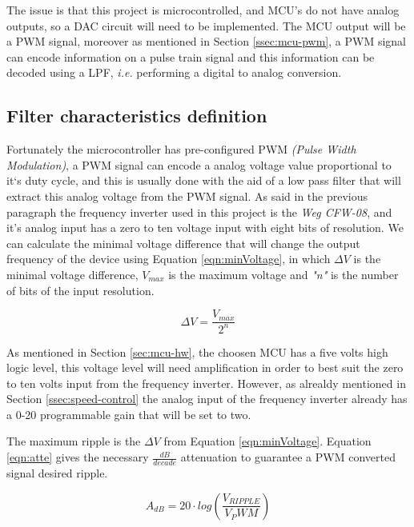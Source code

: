 		The issue is that this project is microcontrolled, and MCU's do not have analog outputs, so a DAC circuit will need to be implemented. The MCU output will be a PWM signal, moreover as mentioned in Section \ref{ssec:mcu-pwm}, a PWM signal can encode information on a pulse train signal and this information can be decoded using a LPF, \textit{i.e.} performing a digital to analog conversion.

	\subsection{Filter characteristics definition}\label{ssec:filterCharacteristicsDefinition}
		\par
		Fortunately the microcontroller has pre-configured PWM \textit{(Pulse Width Modulation)}, a PWM signal can encode a analog voltage value proportional to it`s duty cycle, and this is usually done with the aid of a low pass filter that will extract this analog voltage from the PWM signal. As said in the previous paragraph the frequency inverter used in this project is the \textit{Weg CFW-08}, and it's analog input has a zero to ten voltage input with eight bits of resolution. We can calculate the minimal voltage difference that will change the output frequency of the device using Equation \ref{eqn:minVoltage}, in which $\Delta V$ is the minimal voltage difference, $V_{max}$ is the maximum voltage and \textit{"n"} is the number of bits of the input resolution.

			\begin{equation}\label{eqn:minVoltage}
				\Delta V=\frac{V_{max}}{2^{n}}
			\end{equation}
	
		As mentioned in Section \ref{sec:mcu-hw}, the choosen MCU has a five volts high logic level, this voltage level will need amplification in order to best suit the zero to ten volts input from the frequency inverter. However, as alrealdy mentioned in Section \ref{ssec:speed-control} the analog input of the frequency inverter already has a 0-20 programmable gain that will be set to two. 
		\par
		The maximum ripple is the $\Delta V$ from Equation \ref{eqn:minVoltage}. Equation \ref{eqn:atte} \cite{metivier2013pwm} gives the necessary $\frac{dB}{decade}$ attenuation to guarantee a PWM converted signal desired ripple.

	 		\begin{equation}\label{eqn:atte}
				A_{dB}=20\cdot log \left( \frac{V_{RIPPLE}}{V_PWM} \right) 
			\end{equation}
			
